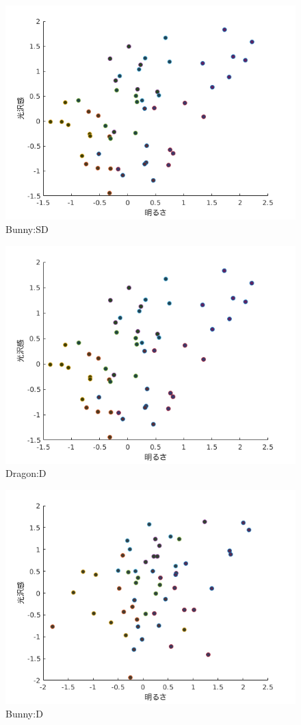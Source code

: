     \begin{figure}[h]
        \centering
        \includegraphics[width=12.0cm]{./img/ex3_BSD.png}
        \caption{Bunny:SD}
        \label{ex3_DSD}
    \end{figure}

    \begin{figure}[h]
        \centering
        \includegraphics[width=12.0cm]{./img/ex3_DD.png}
        \caption{Dragon:D}
        \label{ex3_DD}
    \end{figure}

    \begin{figure}[h]
        \centering
        \includegraphics[width=12.0cm]{./img/ex3_BD.png}
        \caption{Bunny:D}
        \label{ex3_BD}
    \end{figure}

